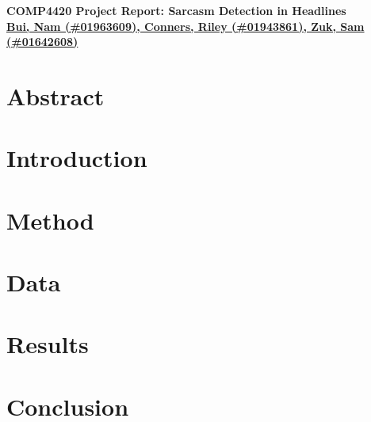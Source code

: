 \documentclass[11pt]{article}
\def\proptitle{COMP4420 Project Report: Sarcasm Detection in Headlines}
\def\propauthors{Bui, Nam (\#01963609), 
                 Conners, Riley (\#01943861), 
                 Zuk, Sam (\#01642608)}
\begin{document}
\begin{center}
    \textbf{\Large{\proptitle}} \\
    \textbf{\underline{\propauthors}}
\end{center}

\bigskip

\section{Abstract}

\section{Introduction}

\section{Method}

\section{Data}

\section{Results}



\section{Conclusion}
\end{document}
